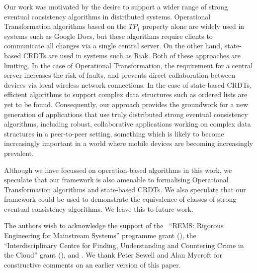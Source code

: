 \documentclass[acmlarge,review]{acmart}
\begin{document}
Our work was motivated by the desire to support a wider range of strong eventual consistency algorithms in distributed systems.
Operational Transformation algorithms based on the $\mathit{TP}_1$ property alone are widely used in systems such as Google Docs, but these algorithms require clients to communicate all changes via a single central server.
On the other hand, state-based CRDTs are used in systems such as Riak.
Both of these approaches are limiting.
In the case of Operational Transformation, the requirement for a central server increases the risk of faults, and prevents direct collaboration between devices via local wireless network connections.
In the case of state-based CRDTs, efficient algorithms to support complex data structures such as ordered lists are yet to be found.
Consequently, our approach provides the groundwork for a new generation of applications that use truly distributed strong eventual consistency algorithms, including robust, collaborative applications working on complex data structures in a peer-to-peer setting, something which is likely to become increasingly important in a world where mobile devices are becoming increasingly prevalent.

Although we have focussed on operation-based algorithms in this work, we speculate that our framework is also amenable to formalising Operational Transformation algorithms and state-based CRDTs.
We also speculate that our framework could be used to demonstrate the equivalence of classes of strong eventual consistency algorithms.
We leave this to future work.

\begin{acks}
    The authors wish to acknowledge the support of the~ ``REMS: Rigorous Engineering for Mainstream Systems'' programme grant (),
    the~ ``Interdisciplinary Centre for Finding, Understanding and Countering Crime in the Cloud'' grant (),
    and .
    We thank Peter Sewell and Alan Mycroft for constructive comments on an earlier version of this paper.
\end{acks}

{}
\end{document}
